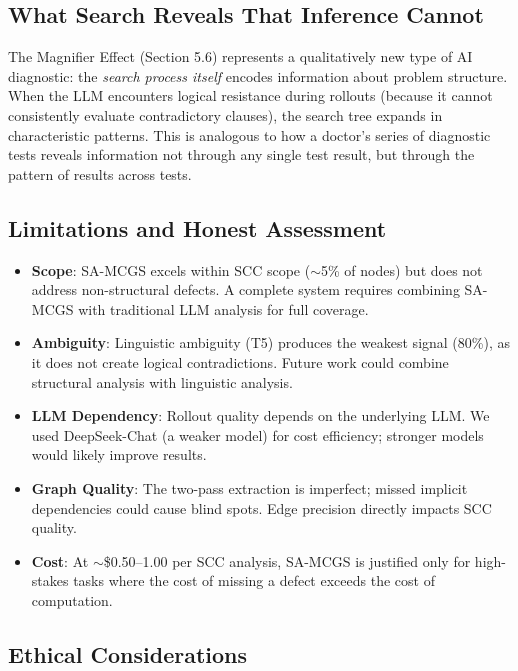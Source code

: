 \documentclass{article}
\begin{document}
\subsection{What Search Reveals That Inference Cannot}

The Magnifier Effect (Section 5.6) represents a qualitatively new type of AI diagnostic: the \emph{search process itself} encodes information about problem structure. When the LLM encounters logical resistance during rollouts (because it cannot consistently evaluate contradictory clauses), the search tree expands in characteristic patterns. This is analogous to how a doctor's series of diagnostic tests reveals information not through any single test result, but through the pattern of results across tests.

\subsection{Limitations and Honest Assessment}

\begin{itemize}[leftmargin=*,itemsep=1pt]
    \item \textbf{Scope}: SA-MCGS excels within SCC scope ($\sim$5\% of nodes) but does not address non-structural defects. A complete system requires combining SA-MCGS with traditional LLM analysis for full coverage.
    \item \textbf{Ambiguity}: Linguistic ambiguity (T5) produces the weakest signal (80\%), as it does not create logical contradictions. Future work could combine structural analysis with linguistic analysis.
    \item \textbf{LLM Dependency}: Rollout quality depends on the underlying LLM. We used DeepSeek-Chat (a weaker model) for cost efficiency; stronger models would likely improve results.
    \item \textbf{Graph Quality}: The two-pass extraction is imperfect; missed implicit dependencies could cause blind spots. Edge precision directly impacts SCC quality.
    \item \textbf{Cost}: At $\sim$\$0.50--1.00 per SCC analysis, SA-MCGS is justified only for high-stakes tasks where the cost of missing a defect exceeds the cost of computation.
\end{itemize}

\subsection{Ethical Considerations}
\end{document}
